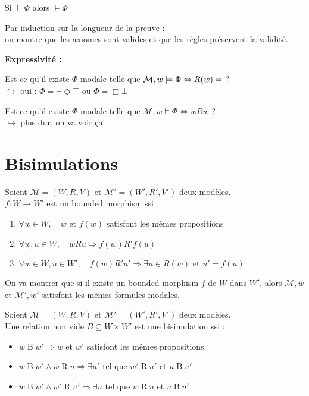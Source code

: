 \documentclass[10pt,a4paper]{article}
\newcommand{\M}{\mathcal{M}}
\DeclareMathOperator{\Ro}{R}
\DeclareMathOperator{\Bo}{B}
\begin{document}
\begin{prop}
 Si $ \vdash \Phi$ alors $ \models \Phi$
\end{prop}
\begin{dem}
 Par induction sur la longueur de la preuve : \\
on montre que les axiomes sont valides et que les règles préservent la validité.
\end{dem}


\textbf{Expressivité :}

\begin{ques}[1]
Est-ce qu'il existe $ \Phi$ modale telle que $ \M, w \models \Phi \Leftrightarrow R(w) = \empty $ ?\\
$\hookrightarrow$ oui : $ \Phi = \lnot \Diamond \top$ ou $ \Phi = \Box \bot$\end{ques}
\begin{ques}[2]Est-ce qu'il existe $ \Phi$ modale telle que $ \M, w \models \Phi \Leftrightarrow w R w$ ?\\
$\hookrightarrow$ plus dur, on va voir ça.\end{ques}

\section{Bisimulations}

\begin{definition} Soient $ \M = (W,R,V)$ et $ \M' = (W',R',V')$ deux modèles.\\
 $ f : W \to W'$ est un \og bounded morphism \fg  ssi
\begin{enumerate}
 \item $ \forall w \in W, \quad w$ et $f(w)$ satisfont les mêmes propositions
 \item $ \forall w,u \in W,\quad w R u \Rightarrow f(w) R' f(u)$
 \item $\forall w \in W, u \in W',\quad  f(w) R' u' \Rightarrow \exists u \in R(w)$ et $u' = f(u)$
\end{enumerate}
\end{definition}

On va montrer que si il existe un \og bounded morphism \fg $f$ de $W$ dans $W'$, alors $ \M,w$ et $ \M',w'$ satisfont les mêmes formules modales.

\begin{definition}[bisimulation]
 Soient $ \M = (W,R,V)$ et $ \M' = (W',R',V')$ deux modèles.\\
Une relation non vide $ B \subseteq W \times W'$ est une bisimulation ssi :
\begin{itemize}
 \item $ w   \Bo w' \Rightarrow w$ et $w'$ satisfont les mêmes propositions.
 \item $w   \Bo w' \wedge w   \Ro u \Rightarrow \exists u'$ tel que $w'   \Ro u'$ et $u   \Bo u'$
 \item $w   \Bo w' \wedge w'   \Ro u' \Rightarrow \exists u$ tel que $w   \Ro u$ et $u   \Bo u'$
\end{itemize}

\end{definition}
\end{document}
